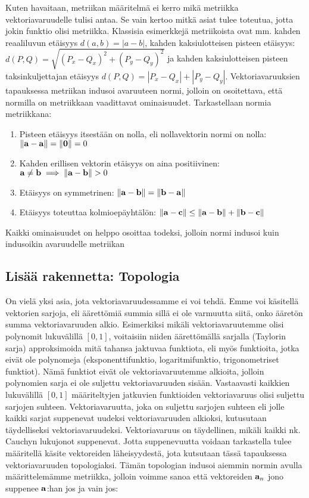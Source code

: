 \documentclass[../johdoksia.tex]{subfiles}
\begin{document}
	Kuten havaitaan, metriikan määritelmä ei kerro mikä metriikka vektoriavaruudelle tulisi antaa. Se vain kertoo mitkä asiat tulee toteutua, jotta jokin funktio olisi metriikka. Klassisia esimerkkejä metriikoista ovat mm. kahden reaaliluvun etäisyys $d(a,b) = |a - b|$, kahden kaksiulotteisen pisteen etäisyys: $d(P, Q) = \sqrt{(P_x - Q_x)^2 + (P_y - Q_y)^2}$ ja kahden kaksiulotteisen pisteen taksinkuljettajan etäisyys $d(P, Q) = |P_x - Q_x| + |P_y - Q_y|$. Vektoriavaruuksien tapauksessa metriikan indusoi avaruuteen normi, jolloin on osoitettava, että normilla on metriikkaan vaadittavat ominaisuudet. Tarkastellaan normia metriikkana:
	
	\begin{enumerate}
		\item Pisteen etäisyys itsestään on nolla, eli nollavektorin normi on nolla: $\norm{\mathbf{a} - \mathbf{a}} = \norm{\mathbf{0}} = 0$
		\item Kahden erillisen vektorin etäisyys on aina positiivinen: $\mathbf{a} \neq \mathbf{b} \implies \norm{\mathbf{a} - \mathbf{b}} > 0$
		\item Etäisyys on symmetrinen: $\norm{\mathbf{a} - \mathbf{b}} = \norm{\mathbf{b} - \mathbf{a}}$
		\item Etäisyys toteuttaa kolmioepäyhtälön: $\norm{\mathbf{a} - \mathbf{c}} \leq \norm{\mathbf{a} - \mathbf{b}} + \norm{\mathbf{b} - \mathbf{c}}$
	\end{enumerate}

	Kaikki ominaisuudet on helppo osoittaa todeksi, jolloin normi indusoi kuin indusoikin avaruudelle metriikan
	
	\subsection{Lisää rakennetta: Topologia}
	
	On vielä yksi asia, jota vektoriavaruudessamme ei voi tehdä. Emme voi käsitellä vektorien sarjoja, eli äärettömiä summia sillä ei ole varmuutta siitä, onko ääretön summa vektoriavaruuden alkio. Esimerkiksi mikäli vektoriavaruutemme olisi polynomit lukuvälillä $[0, 1]$, voitaisiin niiden äärettömällä sarjalla (Taylorin sarja) approksimoida mitä tahansa jaktuvaa funktiota, eli myös funktioita, jotka eivät ole polynomeja (eksponenttifunktio, logaritmifunktio, trigonometriset funktiot). Nämä funktiot eivät ole vektoriavaruutemme alkioita, jolloin polynomien sarja ei ole suljettu vektoriavaruuden sisään. Vastaavasti kaikkien lukuvälillä $[0, 1]$ määriteltyjen jatkuvien funktioiden vektoriavaruus olisi suljettu sarjojen suhteen. Vektoriavaruutta, joka on suljettu sarjojen suhteen eli jolle kaikki sarjat suppenevat uudeksi vektoriavaruuden alkioksi, kutusutaan täydelliseksi vektoriavaruudeksi. Vektoriavaruus on täydellinen, mikäli kaikki nk. Cauchyn lukujonot suppenevat. Jotta suppenevuutta voidaan tarkastella tulee määritellä käsite vektoreiden läheisyydestä, jota kutsutaan tässä tapauksessa vektoriavaruuden topologiaksi. Tämän topologian indusoi aiemmin normin avulla määrittelemämme metriikka, jolloin voimme sanoa että vektoreiden $\mathbf{a}_n$ jono suppenee $\mathbf{a}$:han jos ja vain jos:
	
\end{document}

